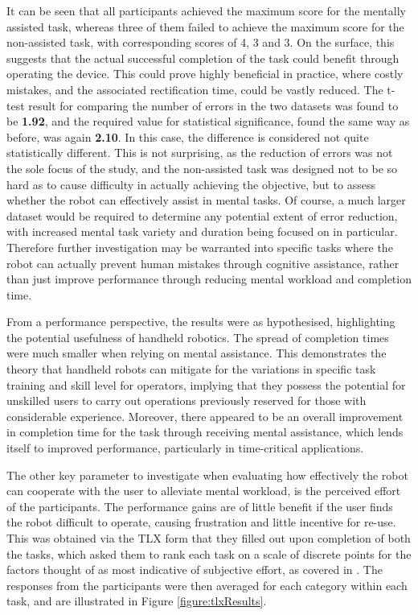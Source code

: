\documentclass[11pt]{article}
\begin{document}
It can be seen that all participants achieved the maximum score for the mentally assisted task, whereas three of them failed to achieve the maximum score for the non-assisted task, with corresponding scores of 4, 3 and 3. On the surface, this suggests that the actual successful completion of the task could benefit through operating the device. This could prove highly beneficial in practice, where costly mistakes, and the associated rectification time, could be vastly reduced. The t-test result for comparing the number of errors in the two datasets was found to be \textbf{1.92}, and the required value for statistical significance, found the same way as before, was again \textbf{2.10}. In this case, the difference is considered not quite statistically different. This is not surprising, as the reduction of errors was not the sole focus of the study, and the non-assisted task was designed not to be so hard as to cause difficulty in actually achieving the objective, but to assess whether the robot can effectively assist in mental tasks. Of course, a much larger dataset would be required to determine any potential extent of error reduction, with increased mental task variety and duration being focused on in particular. Therefore further investigation may be warranted into specific tasks where the robot can actually prevent human mistakes through cognitive assistance, rather than just improve performance through reducing mental workload and completion time.



From a performance perspective, the results were as hypothesised, highlighting the potential usefulness of handheld robotics. The spread of completion times were much smaller when relying on mental assistance. This demonstrates the theory that handheld robots can mitigate for the variations in specific task training and skill level for operators, implying that they possess the potential for unskilled users to carry out operations previously reserved for those with considerable experience. Moreover, there appeared to be an overall improvement in completion time for the task through receiving mental assistance, which lends itself to improved performance, particularly in time-critical applications.

The other key parameter to investigate when evaluating how effectively the robot can cooperate with the user to alleviate mental workload, is the perceived effort of the participants. The performance gains are of little benefit if the user finds the robot difficult to operate, causing frustration and little incentive for re-use. This was obtained via the TLX form that they filled out upon completion of both the tasks, which asked them to rank each task on a scale of discrete points for the factors thought of as most indicative of subjective effort, as covered in \cite{hart1988}. The responses from the participants were then averaged for each category within each task, and are illustrated in Figure \ref{figure:tlxResults}.
\end{document}
